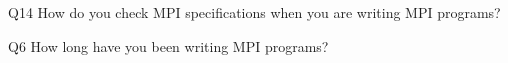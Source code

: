 \begin{description}%
\item{Q14} How do you check MPI specifications when you are writing MPI programs?%
\item{Q6} How long have you been writing MPI programs?%
\end{description}%
